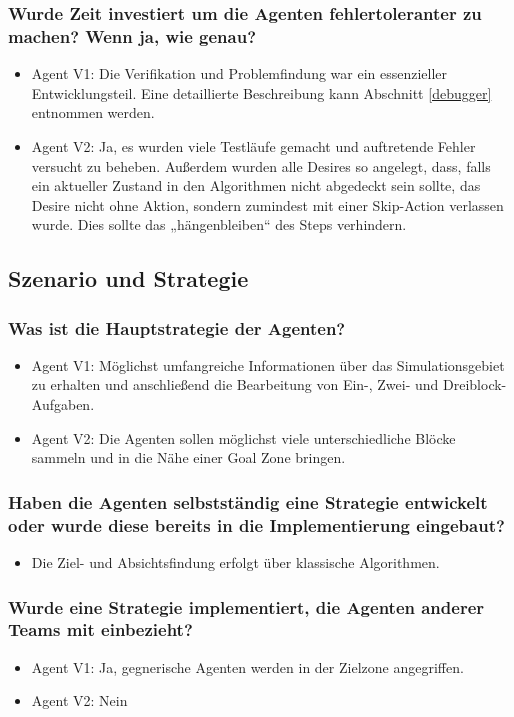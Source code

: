 \documentclass[runningheads]{llncs}
\begin{document}
	\subsubsection{Wurde Zeit investiert um die Agenten fehlertoleranter zu machen? Wenn ja, wie genau?}
	\begin{itemize}
		\item Agent V1: Die Verifikation und Problemfindung war ein essenzieller Entwicklungsteil. Eine detaillierte Beschreibung kann Abschnitt \ref{debugger} entnommen werden.
		\item Agent V2: Ja, es wurden viele Testläufe gemacht und auftretende Fehler versucht zu beheben. Außerdem wurden alle Desires so angelegt, dass, falls ein aktueller Zustand in den Algorithmen nicht abgedeckt sein sollte, das Desire nicht ohne Aktion, sondern zumindest mit einer Skip-Action verlassen wurde. Dies sollte das „hängenbleiben“ des Steps verhindern.
	\end{itemize}
	
	\subsection{Szenario und Strategie}
	\subsubsection{Was ist die Hauptstrategie der Agenten?}
	\begin{itemize}
		\item Agent V1: Möglichst umfangreiche Informationen über das Simulationsgebiet zu erhalten und anschließend die Bearbeitung von Ein-, Zwei- und Dreiblock-Aufgaben.
		\item Agent V2: Die Agenten sollen möglichst viele unterschiedliche Blöcke sammeln und in die Nähe einer Goal Zone bringen.
	\end{itemize}
	
	\subsubsection{Haben die Agenten selbstständig eine Strategie entwickelt oder wurde diese bereits in die Implementierung eingebaut?}
	\begin{itemize}
		\item Die Ziel- und Absichtsfindung erfolgt über klassische Algorithmen.
	\end{itemize}
	
	\subsubsection{Wurde eine Strategie implementiert, die Agenten anderer Teams mit einbezieht?}
	\begin{itemize}
		\item Agent V1: Ja, gegnerische Agenten werden in der Zielzone angegriffen.
		\item Agent V2: Nein
	\end{itemize}
	
\end{document}
